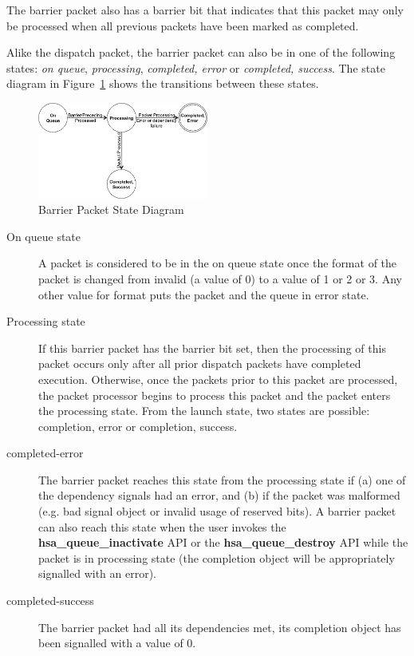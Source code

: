 \documentclass{book}
\newcommand{\reffun}[1]{\textbf{#1}}
\begin{document}
The barrier packet also has a barrier bit that indicates that this
packet may only be processed when all previous packets have been
marked as completed.

Alike the dispatch packet, the barrier packet can also be in one of
the following states: \emph{on queue}, \emph{processing},
\emph{completed, error} or \emph{completed, success}. The state
diagram in Figure~\ref{fig:barrierpacketstate} shows the transitions
between these states.

\begin{figure}
  \centering
  \includegraphics[width=0.5\textwidth] {fig/barrierpacketstate}
  \centering
  \caption{Barrier Packet State Diagram}
  \label{fig:barrierpacketstate}
\end{figure}

\begin{description}
\item[On queue state] A packet is considered to be in the on queue
state once the format of the packet is changed from invalid (a value
of 0) to a value of 1 or 2 or 3. Any other value for format puts the
packet and the queue in error state.
\item[Processing state] If this barrier packet has the barrier bit set,
then the processing of this packet occurs only after all prior
dispatch packets have completed execution.  Otherwise, once the
packets prior to this packet are processed, the packet processor
begins to process this packet and the packet enters the processing
state.  From the launch state, two states are possible: completion,
error or completion, success.
\item[completed-error] The barrier packet reaches this state from
the processing state if (a) one of the dependency signals had an
error, and (b) if the packet was malformed (e.g. bad signal object
or invalid usage of reserved bits). A barrier packet can also reach
this state when the user invokes the \reffun{hsa\_queue\_inactivate}
API or the \reffun{hsa\_queue\_destroy} API while the packet is in
processing state (the completion object will be appropriately
signalled with an error).
\item[completed-success] The barrier packet had all its dependencies
met, its completion object has been signalled with a value of 0.
\end{description}
\end{document}
